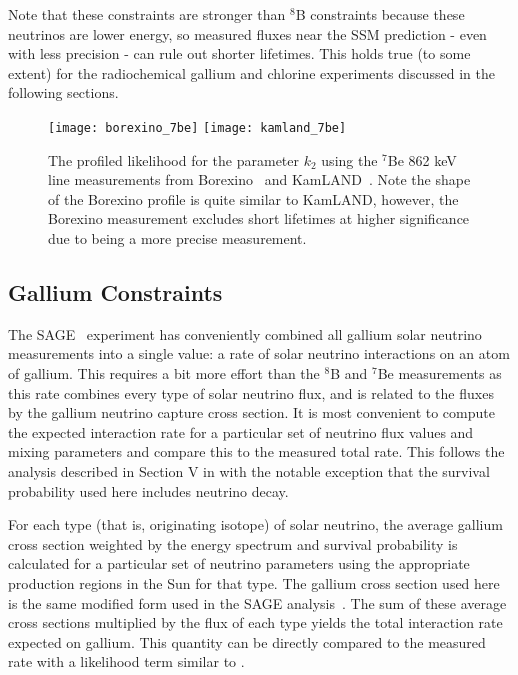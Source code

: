 Note that these constraints are stronger than $^8$B constraints because these neutrinos are lower energy, so measured fluxes near the SSM prediction - even with less precision - can rule out shorter lifetimes.
This holds true (to some extent) for the radiochemical gallium and chlorine experiments discussed in the following sections.

\begin{figure}
\centering
\texttt{[image: borexino\_7be]}
\texttt{[image: kamland\_7be]}
\caption{The profiled likelihood for the parameter $k_2$ using the $^7$Be 862 keV line measurements from Borexino~\cite{borexino7be} and KamLAND~\cite{kamland7be}. Note the shape of the Borexino profile is quite similar to KamLAND, however, the Borexino measurement excludes short lifetimes at higher significance due to being a more precise measurement.}
\label{fig:7be_profiles}
\end{figure}

\subsection{Gallium Constraints}

The SAGE~\cite{sagecombo} experiment has conveniently combined all gallium solar neutrino measurements into a single value: a rate of solar neutrino interactions on an atom of gallium. 
This requires a bit more effort than the $^8$B and $^7$Be measurements as this rate combines every type of solar neutrino flux, and is related to the fluxes by the gallium neutrino capture cross section.
It is most convenient to compute the expected interaction rate for a particular set of neutrino flux values and mixing parameters and compare this to the measured total rate. 
This follows the analysis described in Section V in \cite{sagecombo} with the notable exception that the survival probability used here includes neutrino decay.

For each type (that is, originating isotope) of solar neutrino, the average gallium cross section weighted by the energy spectrum and survival probability is calculated for a particular set of neutrino parameters using the appropriate production regions in the Sun for that type.
The gallium cross section used here is the same modified form used in the SAGE analysis~\cite{sagecombo}.
The sum of these average cross sections multiplied by the flux of each type yields the total interaction rate expected on gallium.
This quantity can be directly compared to the measured rate with a likelihood term similar to .

